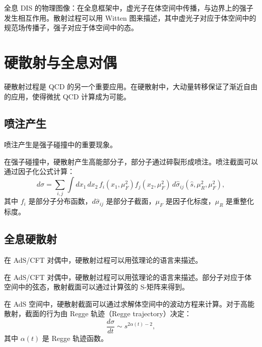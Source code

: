 \begin{remark}
全息 DIS 的物理图像：在全息框架中，虚光子在体空间中传播，与边界上的强子发生相互作用。散射过程可以用 Witten 图来描述，其中虚光子对应于体空间中的规范场传播子，强子对应于体空间中的态。
\end{remark}

\section{硬散射与全息对偶}

硬散射过程是 QCD 的另一个重要应用。在硬散射中，大动量转移保证了渐近自由的应用，使得微扰 QCD 计算成为可能。

\subsection{喷注产生}

喷注产生是强子碰撞中的重要现象。

\begin{definition}[喷注产生]
在强子碰撞中，硬散射产生高能部分子，部分子通过碎裂形成喷注。喷注截面可以通过因子化公式计算：
\begin{equation}
    d\sigma = \sum_{i,j} \int dx_1 \, dx_2 \, f_i(x_1, \mu_F^2) f_j(x_2, \mu_F^2) \, d\hat{\sigma}_{ij}(\hat{s}, \mu_R^2, \mu_F^2),
\end{equation}
其中 $f_i$ 是部分子分布函数，$d\hat{\sigma}_{ij}$ 是部分子截面，$\mu_F$ 是因子化标度，$\mu_R$ 是重整化标度。
\end{definition}

\subsection{全息硬散射}

在 AdS/CFT 对偶中，硬散射过程可以用弦理论的语言来描述。

\begin{definition}[全息硬散射]
在 AdS/CFT 对偶中，硬散射过程可以用弦理论的语言来描述。部分子对应于体空间中的弦态，散射截面可以通过计算弦的 S-矩阵来得到。
\end{definition}

\begin{proposition}[Regge 轨迹]
在 AdS 空间中，硬散射截面可以通过求解体空间中的波动方程来计算。对于高能散射，截面的行为由 Regge 轨迹（Regge trajectory）决定：
\begin{equation}
    \frac{d\sigma}{dt} \sim s^{2\alpha(t) - 2},
\end{equation}
其中 $\alpha(t)$ 是 Regge 轨迹函数。
\end{proposition}


